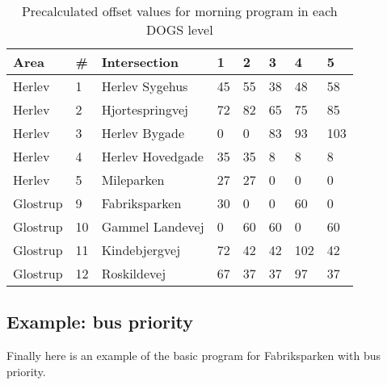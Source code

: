 \begin{table}[ht]
\centering
\begin{tabular}{l|l|l|l|l|l|l|l}
\textbf{Area} & \textbf{\#} & \textbf{Intersection} & \textbf{1} & \textbf{2} & \textbf{3} & \textbf{4} & \textbf{5}\\ \hline
Herlev & 1 & Herlev Sygehus & 45 & 55 & 38 & 48 & 58\\
Herlev & 2 & Hjortespringvej & 72 & 82 & 65 & 75 & 85\\
Herlev & 3 & Herlev Bygade & 0 & 0 & 83 & 93 & 103\\
Herlev & 4 & Herlev Hovedgade & 35 & 35 & 8 & 8 & 8\\
Herlev & 5 & Mileparken & 27 & 27 & 0 & 0 & 0\\ \hline
Glostrup & 9 & Fabriksparken & 30 & 0 & 0 & 60 & 0\\
Glostrup & 10 & Gammel Landevej & 0 & 60 & 60 & 0 & 60\\
Glostrup & 11 & Kindebjergvej & 72 & 42 & 42 & 102 & 42\\
Glostrup & 12 & Roskildevej & 67 & 37 & 37 & 97 & 37\\
\end{tabular}
\caption{Precalculated offset values for morning program in each DOGS level}
\label{tab:offset_values_modified}
\end{table}

\clearpage



\subsection{Example: bus priority}
Finally here is an example of the basic program for Fabriksparken with bus priority.

